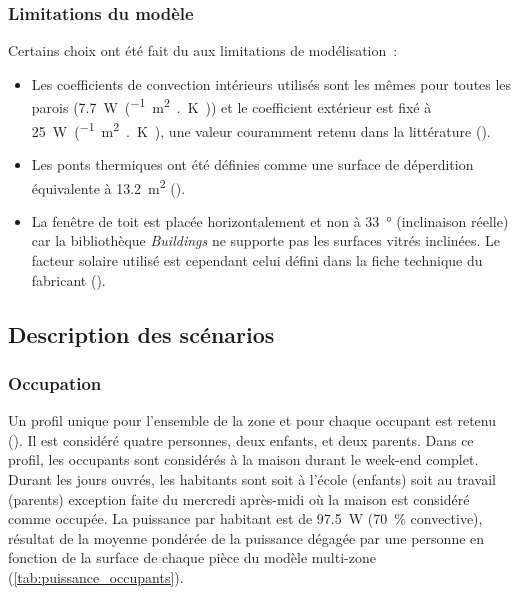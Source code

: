 \subsubsection{Limitations du modèle} %
\label{ssub:limitations_du_modele}
Certains choix ont été fait du aux limitations de modélisation~:
\begin{itemize}
    \item Les coefficients de convection intérieurs utilisés sont les mêmes pour toutes
          les parois (\SI{7.7}{\watt\per(\meter\squared{.}\kelvin)}) et le coefficient extérieur
          est fixé à \SI{25}{\watt\per(\meter\squared{.}\kelvin)}, une valeur couramment retenu
          dans la littérature ().
    \item Les ponts thermiques ont été définies comme une surface de déperdition
          équivalente à \SI{13.2}{\meter\squared} ().
    \item La fenêtre de toit est placée horizontalement et non à \SI{33}{\degree}
          (inclinaison réelle) car la bibliothèque \textit{Buildings} ne supporte pas les
          surfaces vitrés inclinées. Le facteur solaire utilisé est cependant celui défini
          dans la fiche technique du fabricant ().
\end{itemize}


\subsection{Description des scénarios} %
\label{sub:description_des_scenarios}
\subsubsection{Occupation} %
\label{ssub:profil_d_occupation}
Un profil unique pour l’ensemble de la zone et pour chaque occupant est retenu (). Il est considéré quatre personnes, deux enfants, et deux parents. Dans ce profil,
les occupants sont considérés à la maison durant le week-end complet. Durant les jours
ouvrés, les habitants sont soit à l’école (enfants) soit au travail (parents) exception
faite du mercredi après-midi où la maison est considéré comme occupée.
La puissance par habitant est de \SI{97.5}{\watt} (\SI{70}{\percent} convective), résultat
de la moyenne pondérée de la puissance dégagée par une personne en fonction de la surface
de chaque pièce du modèle multi-zone (\ref{tab:puissance_occupants}).

